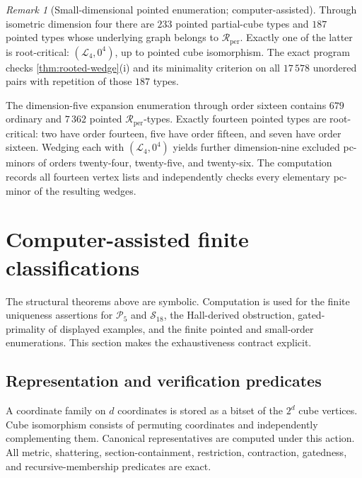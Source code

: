 \documentclass[11pt]{article}
\theoremstyle{definition}
\theoremstyle{remark}
\newtheorem{remark}[theorem]{Remark}
\newcommand{\Rper}{\mathcal R_{\mathrm{per}}}
\begin{document}
\begin{remark}[Small-dimensional pointed enumeration; computer-assisted]
\label{rem:pointed-enumeration}
Through isometric dimension four there are \(233\) pointed partial-cube
types and \(187\) pointed types whose underlying graph belongs to \(\Rper\).
Exactly one of the latter is root-critical:
\((\mathcal L_4,0^4)\), up to pointed cube isomorphism.  The exact program
checks \cref{thm:rooted-wedge}(i) and its minimality criterion on all
\(17\,578\) unordered pairs with repetition of those \(187\) types.

The dimension-five expansion enumeration through order sixteen contains \(679\)
ordinary and \(7\,362\) pointed \(\Rper\)-types.  Exactly fourteen pointed
types are root-critical: two have order fourteen, five have order fifteen,
and seven have order sixteen.  Wedging each with
\((\mathcal L_4,0^4)\) yields further dimension-nine excluded pc-minors of
orders twenty-four, twenty-five, and twenty-six.  The computation records all
fourteen vertex lists and independently checks every elementary pc-minor of
the resulting wedges.
\end{remark}



\section{Computer-assisted finite classifications}
\label{sec:computation}

The structural theorems above are symbolic.  Computation is used for the
finite uniqueness assertions for \(\mathcal P_5\) and \(\mathcal S_{18}\),
the Hall-derived obstruction, gated-primality of displayed examples, and the
finite pointed and small-order enumerations.  This section makes the
exhaustiveness contract explicit.

\subsection{Representation and verification predicates}

A coordinate family on \(d\) coordinates is stored as a bitset of the
\(2^d\) cube vertices.  Cube isomorphism consists of permuting coordinates
and independently complementing them.  Canonical representatives are
computed under this action.  All metric, shattering, section-containment,
restriction, contraction, gatedness, and recursive-membership predicates are
exact.
\end{document}
